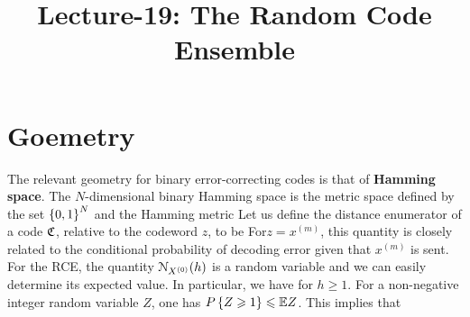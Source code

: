 \documentclass[letterpaper,english,10pt]{article}
\title{Lecture-19: The Random Code Ensemble}
\begin{document}
\maketitle

\section{Goemetry}

The relevant geometry for binary error-correcting codes is that of \textbf{Hamming space}. 
The $N$-dimensional binary Hamming space is the metric space defined by the set  $\left\{0,1\right\}^N$ and the Hamming metric
Let us define the distance enumerator of a code $\mathfrak{C}$, relative to the codeword $z$, to be
For$ z = x^{(m)}$, this quantity is closely related to the conditional probability of decoding error given that $x^{(m)}$ is sent.
For the RCE, the quantity $\mathcal{N}_{X^{(0)}}(h)$ is a random variable and we can easily determine its expected value. 
In particular, we have 
for $h  \ge 1$. 
For a non-negative integer random variable $Z$, one has $P\left\{Z \geqslant 1\right\} \leqslant \mathbb{E} Z$. 
This implies that
\end{document}

